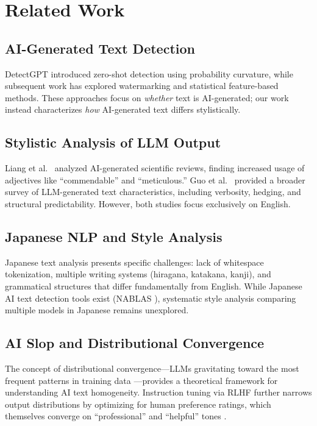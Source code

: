 \documentclass[11pt,a4paper]{article}
\begin{document}
\section{Related Work}

\subsection{AI-Generated Text Detection}

DetectGPT \cite{mitchell2023} introduced zero-shot detection using probability curvature, while subsequent work has explored watermarking \cite{kirchenbauer2023} and statistical feature-based methods. These approaches focus on \textit{whether} text is AI-generated; our work instead characterizes \textit{how} AI-generated text differs stylistically.

\subsection{Stylistic Analysis of LLM Output}

Liang et al.\ \cite{liang2024} analyzed AI-generated scientific reviews, finding increased usage of adjectives like ``commendable'' and ``meticulous.'' Guo et al.\ \cite{guo2024} provided a broader survey of LLM-generated text characteristics, including verbosity, hedging, and structural predictability. However, both studies focus exclusively on English.

\subsection{Japanese NLP and Style Analysis}

Japanese text analysis presents specific challenges: lack of whitespace tokenization, multiple writing systems (hiragana, katakana, kanji), and grammatical structures that differ fundamentally from English. While Japanese AI text detection tools exist (NABLAS \cite{nablas2024}), systematic style analysis comparing multiple models in Japanese remains unexplored.

\subsection{AI Slop and Distributional Convergence}

The concept of distributional convergence---LLMs gravitating toward the most frequent patterns in training data \cite{bommasani2021}---provides a theoretical framework for understanding AI text homogeneity. Instruction tuning via RLHF further narrows output distributions by optimizing for human preference ratings, which themselves converge on ``professional'' and ``helpful'' tones \cite{ouyang2022}.
\end{document}
